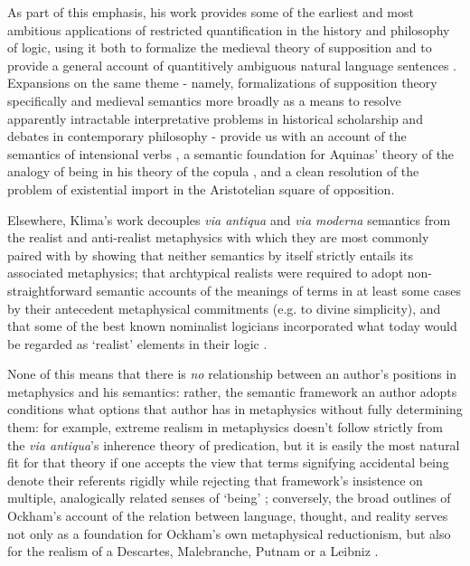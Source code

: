 \documentclass[]{article}
\begin{document}
As part of this emphasis, 
his work provides some of the earliest and most ambitious applications of restricted quantification in the history and philosophy of logic, 
using it both to formalize the medieval theory of supposition and to provide a general account of quantitively ambiguous natural language sentences \autocite{Klima1988,Klima1990,KlimaSandu1990,Klima1991b}. 
Expansions on the same theme - 
namely, formalizations of supposition theory specifically and medieval semantics more broadly as a means to resolve apparently intractable interpretative problems in historical scholarship and debates in contemporary philosophy - 
provide us with an account of the semantics of intensional verbs \autocite{Klima1991}, 
a semantic foundation for Aquinas' theory of the analogy of being in his theory of the copula \autocite{Klima1996,Klima2002}, 
and a clean resolution of the problem of existential import in the Aristotelian square of opposition\autocite{Klima2001}. 

Elsewhere, Klima's work decouples \emph{via antiqua} and \emph{via moderna} semantics from the realist and anti-realist metaphysics with which they are most commonly paired with by showing 
that neither semantics by itself strictly entails its associated metaphysics; 
that archtypical realists were required to adopt non-straightforward semantic accounts of the meanings of terms in at least some cases by their antecedent metaphysical commitments (e.g. to divine simplicity),
and that some of the best known nominalist logicians incorporated what today would be regarded as `realist' elements in their logic \autocite{Klima1999,Klima2005,Klima2011}. 

None of this means that there is \emph{no} relationship between an author's positions in metaphysics and his semantics: 
rather, the semantic framework an author adopts conditions what options that author has in metaphysics without fully determining them: 
for example, extreme realism in metaphysics doesn't follow strictly from the \emph{via antiqua}'s inherence theory of predication, 
but it is easily the most natural fit for that theory if one accepts the view that terms signifying accidental being denote their referents rigidly while rejecting that framework's insistence on multiple, analogically related senses of `being' \autocite{Klima1999}; 
conversely, the broad outlines of Ockham's account of the relation between language, thought, and reality serves not only as a foundation for Ockham's own metaphysical reductionism, but also for the realism of a Descartes, Malebranche, Putnam or a Leibniz \autocite{Klima1991}.
\end{document}
